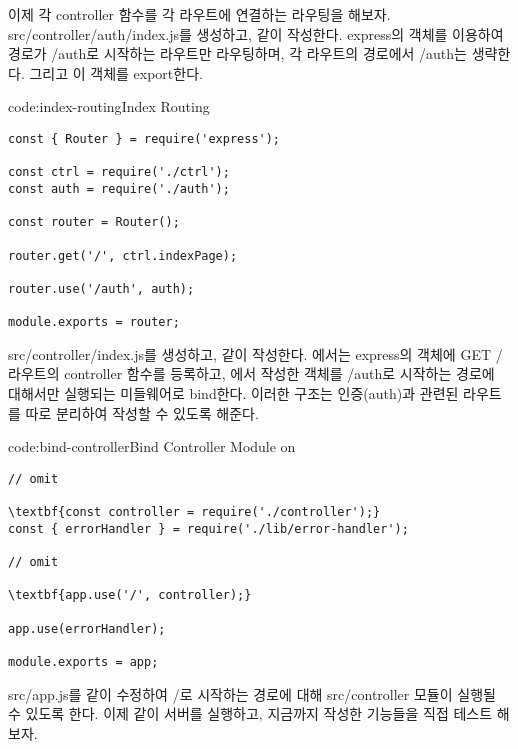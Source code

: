 이제 각 controller 함수를 각 라우트에 연결하는 라우팅을 해보자. src/controller/auth/index.js를 생성하고, \과 같이 작성한다. \은 express의  객체를 이용하여 경로가 /auth로 시작하는 라우트만 라우팅하며, 각 라우트의 경로에서 /auth는 생략한다. 그리고 이  객체를 export한다.

\begin{codeenv}{code:index-routing}{Index Routing}\begin{verbatim}
const { Router } = require('express');

const ctrl = require('./ctrl');
const auth = require('./auth');

const router = Router();

router.get('/', ctrl.indexPage);

router.use('/auth', auth);

module.exports = router;
\end{verbatim}
\end{codeenv}

src/controller/index.js를 생성하고, \과 같이 작성한다. 에서는 express의  객체에 GET / 라우트의 controller 함수를 등록하고, 에서 작성한  객체를 /auth로 시작하는 경로에 대해서만 실행되는 미들웨어로 bind한다. 이러한 구조는 인증(auth)과 관련된 라우트를 따로 분리하여 작성할 수 있도록 해준다.

\begin{codeenv}{code:bind-controller}{Bind Controller Module on }
\begin{Verbatim}[commandchars=\\\{\}]
// omit

\textbf{const controller = require('./controller');}
const { errorHandler } = require('./lib/error-handler');

// omit

\textbf{app.use('/', controller);}

app.use(errorHandler);

module.exports = app;
\end{Verbatim}
\end{codeenv}

src/app.js를 \와 같이 수정하여 /로 시작하는 경로에 대해 src/controller 모듈이 실행될 수 있도록 한다. 이제 \와 같이 서버를 실행하고, 지금까지 작성한 기능들을 직접 테스트 해보자.
\clearpage

